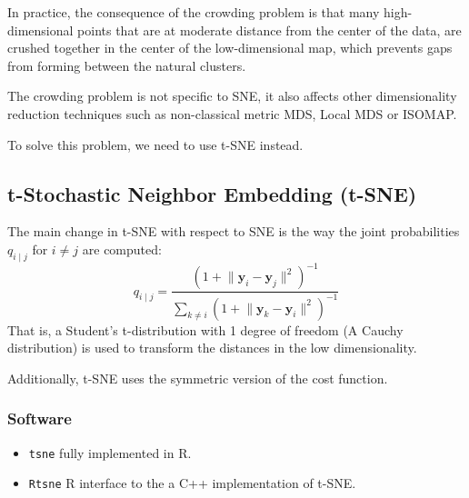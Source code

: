 \begin{marker}
	In practice, the consequence of the crowding problem is that many
	high-dimensional points that are at moderate distance from the
	center of the data, are crushed together in the center of the
	low-dimensional map, which prevents gaps from forming between the
	natural clusters.
\end{marker}

The crowding problem is not specific to SNE, it also affects other
dimensionality reduction techniques such as non-classical metric MDS,
Local MDS or ISOMAP.

To solve this problem, we need to use t-SNE instead.

\subsection{t-Stochastic Neighbor Embedding (t-SNE)}

The main change in t-SNE with respect to SNE is the way the joint
probabilities $q_{i \mid j}$ for $i \neq j$ are computed:
\begin{equation*}
    q_{i \mid j} = \frac
    {
        (1 + \lVert \boldsymbol y_i - \boldsymbol y_j \rVert^2)^{-1}
    }{
        \sum_{k \neq i} (1 + \lVert \boldsymbol y_k - \boldsymbol y_i \rVert^2)^{-1}
    }
\end{equation*}
That is, a Student's t-distribution with 1 degree of freedom (A Cauchy distribution)
is used to transform the distances in the low dimensionality.

Additionally, t-SNE uses the symmetric version of the cost function.

\subsubsection{Software}
\begin{itemize}
    \item \texttt{tsne} fully implemented in R.
    \item \texttt{Rtsne} R interface to the a C++ implementation of t-SNE.
\end{itemize}

